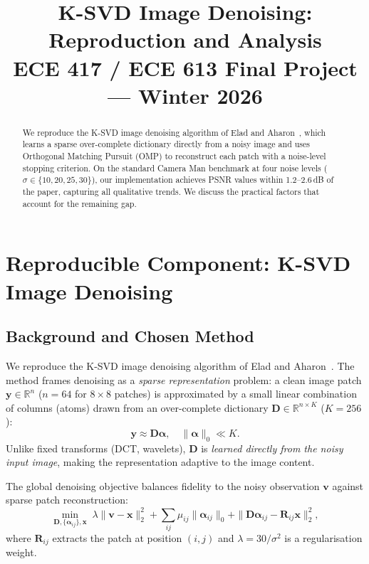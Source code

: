 \documentclass[conference]{IEEEtran}
\begin{document}
\title{K-SVD Image Denoising: Reproduction and Analysis\\
{\large ECE 417 / ECE 613 Final Project --- Winter 2026}}
\author{}
\maketitle

\begin{abstract}
We reproduce the K-SVD image denoising algorithm of Elad and
Aharon~\cite{elad2006image}, which learns a sparse over-complete
dictionary directly from a noisy image and uses Orthogonal Matching
Pursuit (OMP) to reconstruct each patch with a noise-level stopping
criterion.  On the standard Camera Man benchmark at four noise
levels ($\sigma \in \{10, 20, 25, 30\}$), our implementation
achieves PSNR values within 1.2--2.6\,dB of the paper, capturing
all qualitative trends.  We discuss the practical factors that
account for the remaining gap.
\end{abstract}

\section{Reproducible Component: K-SVD Image Denoising}

\subsection{Background and Chosen Method}

We reproduce the K-SVD image denoising algorithm of Elad and
Aharon~\cite{elad2006image}.  The method frames denoising as a
\emph{sparse representation} problem: a clean image patch
$\mathbf{y} \in \mathbb{R}^{n}$ ($n = 64$ for $8\times8$ patches)
is approximated by a small linear combination of columns (atoms)
drawn from an over-complete dictionary
$\mathbf{D} \in \mathbb{R}^{n \times K}$ ($K = 256$):
\begin{equation}
    \mathbf{y} \approx \mathbf{D}\boldsymbol{\alpha}, \quad
    \|\boldsymbol{\alpha}\|_0 \ll K.
    \label{eq:sparse}
\end{equation}
Unlike fixed transforms (DCT, wavelets), $\mathbf{D}$ is
\emph{learned directly from the noisy input image}, making the
representation adaptive to the image content.

The global denoising objective balances fidelity to the noisy
observation $\mathbf{v}$ against sparse patch reconstruction:
\begin{equation}
    \min_{\mathbf{D},\{\boldsymbol{\alpha}_{ij}\},\mathbf{x}} \;
    \lambda\|\mathbf{v}-\mathbf{x}\|_2^2 +
    \sum_{ij}\mu_{ij}\|\boldsymbol{\alpha}_{ij}\|_0 +
    \|\mathbf{D}\boldsymbol{\alpha}_{ij} -
      \mathbf{R}_{ij}\mathbf{x}\|_2^2,
    \label{eq:global}
\end{equation}
where $\mathbf{R}_{ij}$ extracts the patch at position $(i,j)$ and
$\lambda = 30/\sigma^2$ is a regularisation weight.
\end{document}
